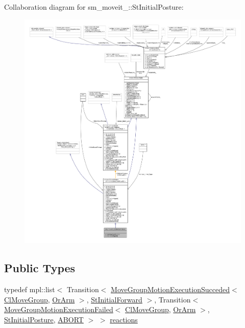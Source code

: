 Collaboration diagram for sm\+\_\+moveit\+\_\+:\+:St\+Initial\+Posture\+:
\nopagebreak
\begin{figure}[H]
\begin{center}
\leavevmode
\includegraphics[width=350pt]{structsm__moveit__3_1_1StInitialPosture__coll__graph}
\end{center}
\end{figure}
\subsection*{Public Types}
\begin{DoxyCompactItemize}
\item 
typedef mpl\+::list$<$ Transition$<$ \hyperlink{structmoveit__z__client_1_1MoveGroupMotionExecutionSucceded}{Move\+Group\+Motion\+Execution\+Succeded}$<$ \hyperlink{classmoveit__z__client_1_1ClMoveGroup}{Cl\+Move\+Group}, \hyperlink{classsm__moveit__3_1_1OrArm}{Or\+Arm} $>$, \hyperlink{structsm__moveit__3_1_1StInitialForward}{St\+Initial\+Forward} $>$, Transition$<$ \hyperlink{structmoveit__z__client_1_1MoveGroupMotionExecutionFailed}{Move\+Group\+Motion\+Execution\+Failed}$<$ \hyperlink{classmoveit__z__client_1_1ClMoveGroup}{Cl\+Move\+Group}, \hyperlink{classsm__moveit__3_1_1OrArm}{Or\+Arm} $>$, \hyperlink{structsm__moveit__3_1_1StInitialPosture}{St\+Initial\+Posture}, \hyperlink{classABORT}{A\+B\+O\+RT} $>$ $>$ \hyperlink{structsm__moveit__3_1_1StInitialPosture_afe716a7a3d6ec5b5905e94c53245417d}{reactions}
\end{DoxyCompactItemize}
